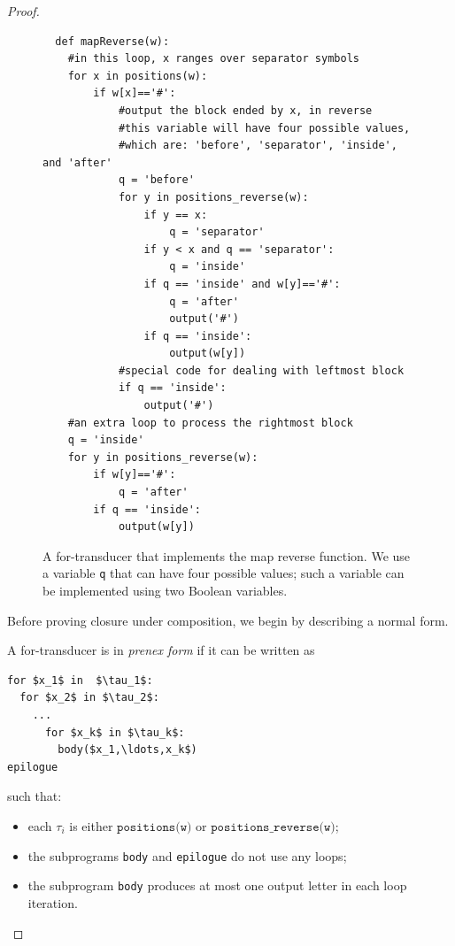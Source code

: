 \begin{proof}
\begin{figure}
\begin{lstlisting}
  def mapReverse(w):
    #in this loop, x ranges over separator symbols
    for x in positions(w):
        if w[x]=='#':
            #output the block ended by x, in reverse
            #this variable will have four possible values, 
            #which are: 'before', 'separator', 'inside', and 'after'
            q = 'before'
            for y in positions_reverse(w):
                if y == x:
                    q = 'separator'
                if y < x and q == 'separator':
                    q = 'inside'
                if q == 'inside' and w[y]=='#':
                    q = 'after'
                    output('#')
                if q == 'inside':
                    output(w[y])
            #special code for dealing with leftmost block
            if q == 'inside':
                output('#')
    #an extra loop to process the rightmost block
    q = 'inside'
    for y in positions_reverse(w):
        if w[y]=='#':
            q = 'after'
        if q == 'inside':
            output(w[y])       
\end{lstlisting}
\caption{\label{fig:map-reverse-for-transducer}
  A for-transducer that implements the map reverse function. We use a variable {\tt q} that can have four possible values; such a variable can be implemented using two Boolean variables.}
\end{figure}

Before proving closure under composition, we begin by describing a normal form.

\begin{definition}
\label{def:prenex-normal-form-for-transducers}
A for-transducer is in \emph{prenex form} if it can be written as
\begin{lstlisting}
for $x_1$ in  $\tau_1$:
  for $x_2$ in $\tau_2$:
    ...
      for $x_k$ in $\tau_k$:
        body($x_1,\ldots,x_k$)
epilogue
            \end{lstlisting}
such that: 
\begin{itemize}
  \item each $\tau_i$ is either $\texttt{positions(w)}$ or $\texttt{positions\_reverse(w)}$;
  \item the subprograms {\tt body} and {\tt epilogue} do not use any loops;
  \item the subprogram {\tt body} produces at most one output letter in each loop iteration.
\end{itemize}
\end{definition}


\end{proof}
